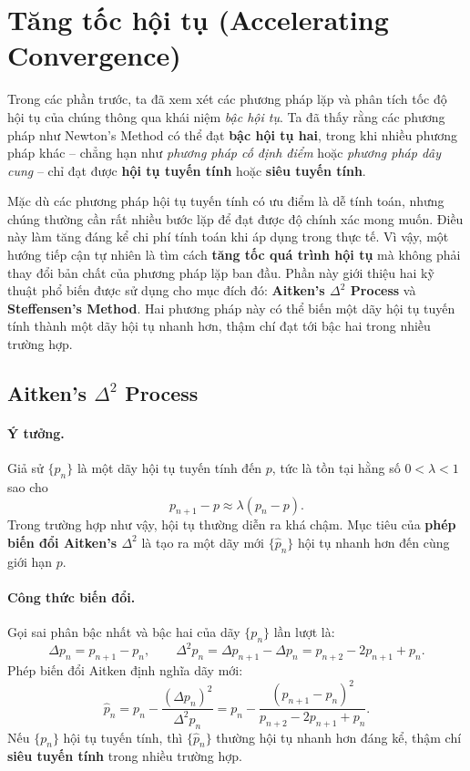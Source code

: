 \section{Tăng tốc hội tụ (Accelerating Convergence)}

Trong các phần trước, ta đã xem xét các phương pháp lặp 
và phân tích tốc độ hội tụ của chúng thông qua khái niệm \textit{bậc hội tụ}.
Ta đã thấy rằng các phương pháp như Newton’s Method có thể đạt \textbf{bậc hội tụ hai},
trong khi nhiều phương pháp khác – chẳng hạn như \textit{phương pháp cố định điểm} 
hoặc \textit{phương pháp dây cung} – chỉ đạt được \textbf{hội tụ tuyến tính} hoặc 
\textbf{siêu tuyến tính}.

Mặc dù các phương pháp hội tụ tuyến tính có ưu điểm là dễ tính toán,
nhưng chúng thường cần rất nhiều bước lặp để đạt được độ chính xác mong muốn.
Điều này làm tăng đáng kể chi phí tính toán khi áp dụng trong thực tế.
Vì vậy, một hướng tiếp cận tự nhiên là tìm cách \textbf{tăng tốc quá trình hội tụ}
mà không phải thay đổi bản chất của phương pháp lặp ban đầu.
Phần này giới thiệu hai kỹ thuật phổ biến được sử dụng cho mục đích đó:
\textbf{Aitken’s $\Delta^2$ Process} và \textbf{Steffensen’s Method}.
Hai phương pháp này có thể biến một dãy hội tụ tuyến tính thành một dãy hội tụ nhanh hơn, thậm chí đạt tới bậc hai trong nhiều trường hợp.

\subsection{Aitken’s $\Delta^2$ Process}

\paragraph*{Ý tưởng.}
Giả sử $\{p_n\}$ là một dãy hội tụ tuyến tính đến $p$, tức là tồn tại hằng số $0 < \lambda < 1$ sao cho
\[
    p_{n+1} - p \approx \lambda (p_n - p).
\]
Trong trường hợp như vậy, hội tụ thường diễn ra khá chậm.  
Mục tiêu của \textbf{phép biến đổi Aitken’s $\Delta^2$} 
là tạo ra một dãy mới $\{\hat{p}_n\}$ hội tụ nhanh hơn đến cùng giới hạn $p$.

\paragraph*{Công thức biến đổi.}
Gọi sai phân bậc nhất và bậc hai của dãy $\{p_n\}$ lần lượt là:
\[
    \Delta p_n = p_{n+1} - p_n, \qquad
    \Delta^2 p_n = \Delta p_{n+1} - \Delta p_n = p_{n+2} - 2p_{n+1} + p_n.
\]
Phép biến đổi Aitken định nghĩa dãy mới:
\[
    \hat{p}_n = p_n - \frac{(\Delta p_n)^2}{\Delta^2 p_n}
    = p_n - \frac{(p_{n+1} - p_n)^2}{p_{n+2} - 2p_{n+1} + p_n}.
\]
Nếu $\{p_n\}$ hội tụ tuyến tính, thì $\{\hat{p}_n\}$ thường hội tụ nhanh hơn đáng kể, 
thậm chí \textbf{siêu tuyến tính} trong nhiều trường hợp.

